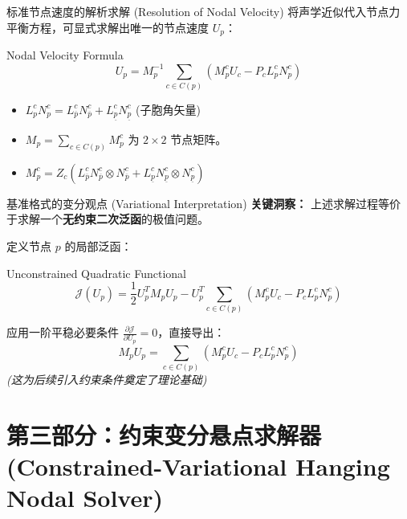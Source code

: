 \documentclass{beamer}
\begin{document}
	\begin{frame}{标准节点速度的解析求解 (Resolution of Nodal Velocity)}
		将声学近似代入节点力平衡方程，可显式求解出唯一的节点速度 $U_p$：
		
		\begin{block}{Nodal Velocity Formula}
			\begin{equation*}
				U_p = M_p^{-1} \sum_{c\in C(p)} (M_p^c U_c - P_c L_p^c N_p^c)
			\end{equation*}
		\end{block}
		
		\begin{itemize}
			\item $L_p^c N_p^c = L_{\overline{p}}^c N_{\overline{p}}^c + L_{\underline{p}}^c N_{\underline{p}}^c$ (子胞角矢量)
			\item $M_p = \sum_{c\in C(p)} M_p^c$ 为 $2\times 2$ 节点矩阵。
			\item $M_p^c = Z_c (L_{\overline{p}}^c N_{\overline{p}}^c \otimes N_{\overline{p}}^c + L_{\underline{p}}^c N_{\underline{p}}^c \otimes N_{\underline{p}}^c)$
		\end{itemize}
	\end{frame}
	
	\begin{frame}{基准格式的变分观点 (Variational Interpretation)}
		\textbf{关键洞察：} 上述求解过程等价于求解一个\textbf{无约束二次泛函}的极值问题。
		
		定义节点 $p$ 的局部泛函：
		\begin{block}{Unconstrained Quadratic Functional}
			\begin{equation*}
				\mathcal{J}(U_p) = \frac{1}{2}U_p^T M_p U_p - U_p^T \sum_{c\in C(p)}(M_p^c U_c - P_c L_p^c N_p^c)
			\end{equation*}
		\end{block}
		
		\vspace{0.2cm}
		应用一阶平稳必要条件 $\frac{\partial\mathcal{J}}{\partial U_p} = 0$，直接导出：
		\begin{equation*}
			M_p U_p = \sum_{c\in C(p)} (M_p^c U_c - P_c L_p^c N_p^c)
		\end{equation*}
		\textit{(这为后续引入约束条件奠定了理论基础)}
	\end{frame}
	
	\section{第三部分：约束变分悬点求解器 (Constrained-Variational Hanging Nodal Solver)}
	
\end{document}
